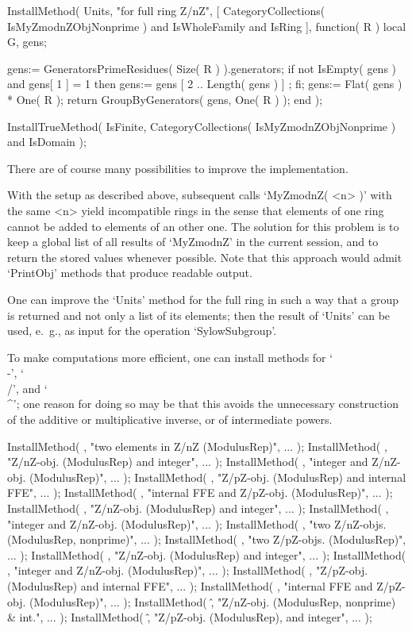 InstallMethod( Units,
    "for full ring Z/nZ",
    [     CategoryCollections( IsMyZmodnZObjNonprime )
      and IsWholeFamily and IsRing ],
    function( R )
    local G, gens;

    gens:= GeneratorsPrimeResidues( Size( R ) ).generators;
    if not IsEmpty( gens ) and gens[ 1 ] = 1 then
      gens:= gens{ [ 2 .. Length( gens ) ] };
    fi;
    gens:= Flat( gens ) * One( R );
    return GroupByGenerators( gens, One( R ) );
    end );

InstallTrueMethod( IsFinite,
    CategoryCollections( IsMyZmodnZObjNonprime ) and IsDomain );
\endtt



There are of course many possibilities to improve the implementation.

With the setup as described above,
subsequent calls `MyZmodnZ( <n> )' with the same <n> yield incompatible
rings in the sense that elements of one ring cannot be added to elements
of an other one.
The solution for this problem is to keep a global list of all results of
`MyZmodnZ' in the current {\GAP} session, and to return the stored values
whenever possible.
Note that this approach would admit `PrintObj' methods that produce
{\GAP} readable output.

One can improve the `Units' method for the full ring in such a way
that a group is returned and not only a list of its elements;
then the result of `Units' can be used, e.~g., as input for the operation
`SylowSubgroup'.

To make computations more efficient,
one can install methods for `\\-', `\\/', and `\\^';
one reason for doing so may be that this avoids the unnecessary construction
of the additive or multiplicative inverse, or of intermediate powers.

\begintt
InstallMethod( \-, "two elements in Z/nZ (ModulusRep)", ... );
InstallMethod( \-, "Z/nZ-obj. (ModulusRep) and integer", ... );
InstallMethod( \-, "integer and Z/nZ-obj. (ModulusRep)", ... );
InstallMethod( \-, "Z/pZ-obj. (ModulusRep) and internal FFE", ... );
InstallMethod( \-, "internal FFE and Z/pZ-obj. (ModulusRep)", ... );
InstallMethod( \*, "Z/nZ-obj. (ModulusRep) and integer", ... );
InstallMethod( \*, "integer and Z/nZ-obj. (ModulusRep)", ... );
InstallMethod( \/, "two Z/nZ-objs. (ModulusRep, nonprime)", ... );
InstallMethod( \/, "two Z/pZ-objs. (ModulusRep)", ... );
InstallMethod( \/, "Z/nZ-obj. (ModulusRep) and integer", ... );
InstallMethod( \/, "integer and Z/nZ-obj. (ModulusRep)", ... );
InstallMethod( \/, "Z/pZ-obj. (ModulusRep) and internal FFE", ... );
InstallMethod( \/, "internal FFE and Z/pZ-obj. (ModulusRep)", ... );
InstallMethod( \^, "Z/nZ-obj. (ModulusRep, nonprime) & int.", ... );
InstallMethod( \^, "Z/pZ-obj. (ModulusRep), and integer", ... );
\endtt

